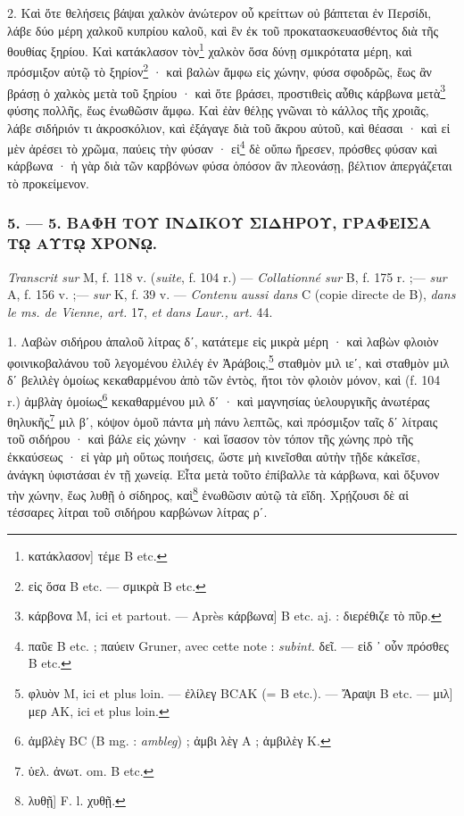 \documentclass[a4paper, 11pt, oneside, polutonikogreek, french]{article}
\begin{document}
2. Καὶ ὅτε θελήσεις βάψαι χαλκὸν ἀνώτερον οὗ κρείττων οὐ βάπτεται ἐν Περσίδι, λάβε δύο μέρη χαλκοῦ κυπρίου καλοῦ, καὶ ἓν ἐκ τοῦ προκατασκευασθέντος διὰ τῆς θουθίας ξηρίου. Καὶ κατάκλασον τὸν\footnote{κατάκλασον] τέμε B etc.} χαλκὸν ὅσα δύνῃ σμικρότατα μέρη, καὶ πρόσμιξον αὐτῷ τὸ ξηρίον\footnote{εἰς ὅσα B etc. --- σμικρὰ B etc.} · καὶ βαλὼν ἄμφω εἰς χώνην, φύσα σφοδρῶς, ἕως ἂν βράσῃ ὁ χαλκὸς μετὰ τοῦ ξηρίου · καὶ ὅτε βράσει, προστιθεὶς αὖθις κάρβωνα μετὰ\footnote{κάρβονα M, ici et partout. --- Après κάρβωνα] B etc. aj. : διερέθιζε τὸ πῦρ.} φύσης πολλῆς, ἕως ἑνωθῶσιν ἄμφω. Καὶ ἐὰν θέλῃς γνῶναι τὸ κάλλος τῆς χροιᾶς, λάβε σιδήριόν τι ἀκροσκόλιον, καὶ ἐξάγαγε διὰ τοῦ ἄκρου αὐτοῦ, καὶ θέασαι · καὶ εἰ μὲν ἀρέσει τὸ χρῶμα, παύεις τὴν φύσαν · εἰ\footnote{παῦε B etc. ; παύειν Gruner, avec cette note : \emph{subint.} δεῖ. --- εἰδ ᾽ οὗν πρόσθες B etc.} δὲ οὔπω ἤρεσεν, πρόσθες φύσαν καὶ κάρβωνα · ἡ γὰρ διὰ τῶν καρβόνων φύσα ὁπόσον ἂν πλεονάσῃ, βέλτιον ἀπεργάζεται τὸ προκείμενον.

\bigskip
\centerline{\EightStarTaper}
\centerline{\EightStarTaper\EightStarTaper}
\bigskip

\subsubsection{5. --- 5. ΒΑΦΗ ΤΟΥ ΙΝΔΙΚΟΥ ΣΙΔΗΡΟΥ, ΓΡΑΦΕΙΣΑ Τῼ ΑΥΤῼ ΧΡΟΝῼ.}

\emph{Transcrit sur} M, f. 118 v. (\emph{suite}, f. 104 r.) --- \emph{Collationné sur} B, f. 175 r. ;--- \emph{sur} A, f. 156 v. ;--- \emph{sur} K, f. 39 v. --- \emph{Contenu aussi dans} C (copie directe de B), \emph{dans le ms. de Vienne, art.} 17, \emph{et dans Laur., art.} 44.

\bigskip

1. Λαβὼν σιδήρου ἁπαλοῦ λίτρας δʹ, κατάτεμε εἰς μικρὰ μέρη · καὶ λαβὼν φλοιὸν φοινικοβαλάνου τοῦ λεγομένου ἐλιλέγ ἐν Ἀράβοις,\footnote{φλυὸν M, ici et plus loin. --- ἐλίλεγ BCAK (= B etc.). --- Ἄραψι B etc. --- μιλ] μερ AK, ici et plus loin.} σταθμὸν μιλ ιεʹ, καὶ σταθμὸν μιλ δʹ βελιλὲγ ὁμοίως κεκαθαρμένου ἀπὸ τῶν ἐντὸς, ἤτοι τὸν φλοιὸν μόνον, καὶ (f. 104 r.) ἀμβλὰγ ὁμοίως\footnote{ἀμβλὲγ BC (B mg. : \emph{ambleg}) ; ἀμβι λὲγ A ; ἀμβιλὲγ K.} κεκαθαρμένου μιλ δʹ · καὶ μαγνησίας ὑελουργικῆς ἀνωτέρας θηλυκῆς\footnote{ὑελ. ἀνωτ. om. B etc.} μιλ βʹ, κόψον ὁμοῦ πάντα μὴ πάνυ λεπτῶς, καὶ πρόσμιξον ταῖς δʹ λίτραις τοῦ σιδήρου · καὶ βάλε εἰς χώνην · καὶ ἴσασον τὸν τόπον τῆς χώνης πρὸ τῆς ἐκκαύσεως · εἰ γὰρ μὴ οὕτως ποιήσεις, ὥστε μὴ κινεῖσθαι αὐτὴν τῇδε κἀκεῖσε, ἀνάγκη ὑφιστάσαι ἐν τῇ χωνείᾳ. Εἶτα μετὰ τοῦτο ἐπίβαλλε τὰ κάρβωνα, καὶ ὄξυνον τὴν χώνην, ἕως λυθῇ ὁ σίδηρος, καὶ\footnote{λυθῇ] F. l. χυθῇ.} ἑνωθῶσιν αὐτῷ τὰ εἴδη. Χρῄζουσι δὲ αἱ τέσσαρες λίτραι τοῦ σιδήρου καρβώνων λίτρας ρʹ.
\end{document}
